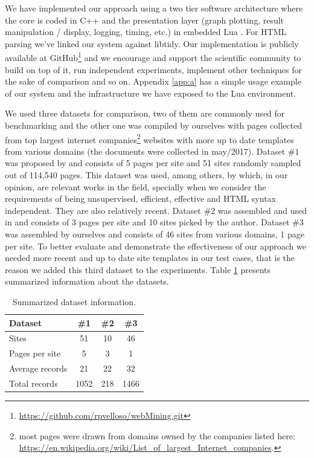 \documentclass{vldb}
\begin{document}
We have implemented our approach using a two tier software architecture where
the core is coded in C++ and the presentation layer (graph plotting, result
manipulation / display, logging, timing, etc.) in embedded Lua \cite{luahome}.
For HTML parsing we've linked our system against libtidy\cite{libtidy}. Our
implementation is publicly available at
GitHub\footnote{\url{https://github.com/rpvelloso/webMining.git}} and we
encourage and support the scientific community to build on top of it, run
independent experiments, implement other techniques for the sake of comparison
and so on.
Appendix \ref{app:a} has a simple usage example of our system and the
infrastructure we have exposed to the Lua environment.

We used three datasets for comparison, two of them are commonly used for
benchmarking and the other one was compiled by ourselves with pages collected
from top largest internet companies\footnote{most pages were drawn from domains
owned by the companies listed here:
\url{https://en.wikipedia.org/wiki/List_of_largest_Internet_companies}.}
websites with more up to date templates from various domains (the documents were
collected in may/2017). Dataset $\#1$ was proposed by \cite{yamada2004testbed}
and consists of 5 pages per site and 51 sites randomly sampled out of 114,540
pages. This dataset was used, among others, by \cite{TPC09,grigalis2013towards}
which, in our opinion, are relevant works in the field, specially when we
consider the requirements of being unsupervised, efficient, effective and HTML
syntax independent. They are also relatively recent.
Dataset $\#2$ was assembled and used in \cite{grigalis2013towards} and consists
of 3 pages per site and 10 sites picked by the author. Dataset \#3 was assembled
by ourselves and consists of 46 sites from various domains, 1 page per site. To
better evaluate and demonstrate the effectiveness of our approach we needed more
recent and up to date site templates in our test cases, that is the reason we
added this third dataset to the experiments.
Table \ref{table:dataset} presents summarized information about the datasets.

\begin{table}[h]
\centering
\caption{Summarized dataset information.}
\label{table:dataset}
\begin{tabular}
{|l| c| c| c|}\hline
Dataset	& \#1	& \#2 & \#3 \\ \hline
Sites &	51 & 10 & 46\\ \hline
Pages per site	& 5 & 3 & 1\\ \hline
Average records & 21 & 22 & 32 \\ \hline
Total records &	1052 & 218 & 1466 \\ \hline
\end{tabular}
\end{table}
\end{document}

